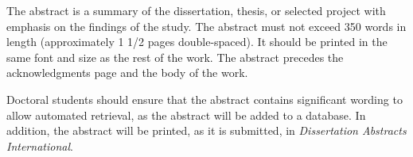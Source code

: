The abstract is a summary of the dissertation, thesis, or
selected project with emphasis on the findings of the study.
The abstract must not exceed 350 words in length (approximately
1 1/2 pages double-spaced).  It should be printed in the same
font and size as the rest of the work.  The abstract precedes
the acknowledgments page and the body of the work.

Doctoral students should ensure that the abstract
contains significant wording to allow automated retrieval, as the
abstract will be added to a database.  In addition, the abstract
will be printed, as it is submitted, in {\it Dissertation
Abstracts International}.

